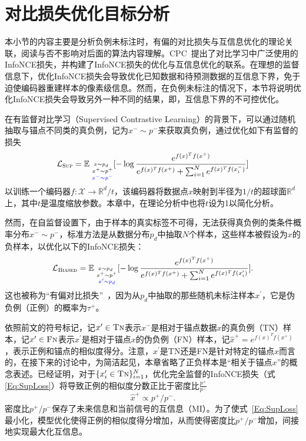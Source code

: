 \section{对比损失优化目标分析}\label{sec6:obj}
本小节的内容主要是分析负例未标注时，有偏的对比损失与互信息优化的理论关联，阅读与否不影响对后面的算法内容理解。CPC~\cite{Oord:2018:arxiv}提出了对比学习中广泛使用的InfoNCE损失，并构建了InfoNCE损失的优化与互信息优化的联系。在理想的监督信息下，优化InfoNCE损失会导致优化已知数据和待预测数据的互信息下界，免于迫使编码器重建样本的像素级信息。然而，在负例未标注的情况下，本节将说明优化InfoNCE损失会导致另外一种不同的结果，即，互信息下界的不可控优化。

在有监督对比学习（Supervised Contrastive Learning）的背景下，可以通过随机抽取与锚点不同类的真负例，记为$x^-\sim p^-$来获取真负例，通过优化如下有监督的损失
\begin{equation}\label{Eq:SupLoss}
	\small
	\mathcal{L}_\textsc{Sup} = \mathbb E_{\substack{x \sim p_d\\~x^+ \sim p^+\\\color{blue}{~x^- \sim p^-}} }
	[-\log \frac{e^{f(x)^Tf(x^+)}}{e^{f(x)^Tf(x^+)} + \sum_{i=1}^Ne^{f(x)^Tf(x_i^-)}}]
\end{equation}
以训练一个编码器$f: \mathcal{X} \rightarrow \mathbb{R}^d/t$，该编码器将数据点$x$映射到半径为$1/t$的超球面$\mathbb{R}^d$上，其中$t$是温度缩放参数。本章中，在理论分析中也将$t$设为1以简化分析。

然而，在自监督设置下，由于样本的真实标签不可得，无法获得真负例的类条件概率分布$x^- \sim p^-$，标准方法是从数据分布$p_d$中抽取$N$个样本，这些样本被假设为$x$的负样本，以优化以下的InfoNCE损失：
\begin{equation}\label{Eq:BiasLoss}
	\small
	\mathcal{L}_\textsc{Biased}= \mathbb E_{ \substack{x \sim p_d\\~x^+ \sim p^+\\\color{blue}{~x^\prime \sim p_d}}}
	[-\log \frac{e^{f(x)^Tf(x^+)}}{e^{f(x)^Tf(x^+)} + \sum_{i=1}^{N}e^{f(x)^Tf(x_i^\prime)}}].
\end{equation}
这也被称为“有偏对比损失”~\cite{Chuang:2020:NIPS}，因为从$p_d$中抽取的那些随机未标注样本$x^\prime$，它是伪负例（正例）的概率为$\tau^+$。

依照前文的符号标记，记$x^\prime\in \textsc{Tn}$表示$x^-$是相对于锚点数据$x$的真负例（TN）样本，记$x^\prime\in \textsc{Fn}$表示$x^\prime$是相对于锚点$x$的伪负例（FN）样本，记$\hat{x}^+=e^{f(x)^Tf(x^+)}$，表示正例和锚点的相似度得分。注意，$x^\prime$是TN还是FN是针对特定的锚点$x$而言的，在接下来的讨论中，为简洁起见，本章省略了正负样本是“相关于锚点$x$”的概念表述。已经证明，对于$\{x_i^\prime \in \textsc{Tn} \}_{i=1}^N$，优化完全监督的InfoNCE损失（式\eqref{Eq:SupLoss}）将导致正例的相似度分数正比于密度比$\frac{p^+}{p^-}$\cite{Oord:2018:arxiv,Ben:2019:ICML}
\begin{equation}\label{Eq:LsupDensityRatio}
	\hat{x}^+ \propto p^+/p^-.
\end{equation}
密度比$p^+/p^-$保存了未来信息和当前信号的互信息（MI）\cite{Oord:2018:arxiv,Ben:2019:ICML,Belghazi:2018:ICML}。为了使式~\eqref{Eq:SupLoss}最小化，模型优化使得正例的相似度得分增加，从而使得密度比$p^+/p^-$增加，间接地实现最大化互信息。

